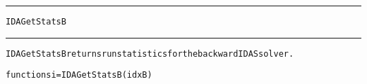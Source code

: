 \begin{samepage}
\hrule
\begin{center}
{\large \verb!IDAGetStatsB!}
\label{p:IDAGetStatsB}
\end{center}
\hrule\vspace{0.1in}



\begin{alltt}
IDAGetStatsB returns run statistics for the backward IDAS solver.
\end{alltt}

\end{samepage}



\begin{samepage}


\begin{alltt}
function si = IDAGetStatsB(idxB) 
\end{alltt}

\end{samepage}



